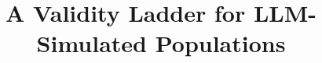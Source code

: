 \documentclass[man,12pt,floatsintext,natbib]{apa7}
\title{A Validity Ladder for LLM-Simulated Populations}
\begin{document}
\renewcommand{\doiprefix}{https://doi.org/\ignorespaces}
\renewcommand{\BRetrievedFrom}{}
\maketitle











\end{document}
